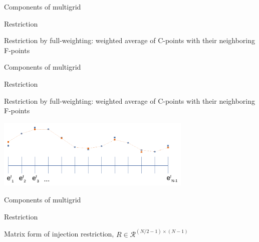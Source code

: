 \documentclass[18pt,xcolor=table]{beamer}
\begin{document}
\begin{frame}{Components of multigrid}
\begin{block}{Restriction}
\bit
\item Restriction by full-weighting: weighted average of C-points with their neighboring F-points
\eit
{}
\end{block}
\end{frame}

\begin{frame}{Components of multigrid}
\begin{block}{Restriction}
\bit
\item Restriction by full-weighting: weighted average of C-points with their neighboring F-points
\eit
\end{block}
\begin{center}
\includegraphics[width=0.7\textwidth]{../figures/fullWeightingResidual}
\end{center}
\end{frame}


\begin{frame}{Components of multigrid}
\begin{block}{Restriction}
\bit
\item Matrix form of injection restriction, $R\in\mathcal{R}^{(N/2-1)\times(N-1)}$
\eit
{}
\end{block}
\end{frame}
\end{document}
